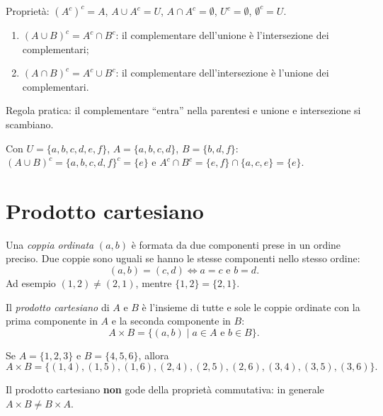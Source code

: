 \documentclass[11pt,a4paper]{article}
\begin{document}
Proprietà: $(A^c)^c = A$, \quad $A \cup A^c = U$, \quad
$A \cap A^c = \emptyset$, \quad $U^c = \emptyset$, \quad $\emptyset^c = U$.

\begin{teorema}
\begin{enumerate}
    \item $(A \cup B)^c = A^c \cap B^c$: il complementare dell'unione
          è l'intersezione dei complementari;
    \item $(A \cap B)^c = A^c \cup B^c$: il complementare
          dell'intersezione è l'unione dei complementari.
\end{enumerate}
\end{teorema}

Regola pratica: il complementare ``entra'' nella parentesi e unione e
intersezione si scambiano.

\begin{esempio}
Con $U = \{a, b, c, d, e, f\}$, $A = \{a, b, c, d\}$, $B = \{b, d, f\}$:
$(A \cup B)^c = \{a,b,c,d,f\}^c = \{e\}$ e
$A^c \cap B^c = \{e, f\} \cap \{a, c, e\} = \{e\}$.
\end{esempio}

\section{Prodotto cartesiano}

\begin{definizione}
Una \emph{coppia ordinata} $(a, b)$ è formata da due componenti prese in un
ordine preciso. Due coppie sono uguali se hanno le stesse componenti nello
stesso ordine:
\[
(a, b) = (c, d) \iff a = c \text{ e } b = d.
\]
Ad esempio $(1, 2) \neq (2, 1)$, mentre $\{1, 2\} = \{2, 1\}$.
\end{definizione}

\begin{definizione}
Il \emph{prodotto cartesiano} di $A$ e $B$ è l'insieme di tutte e sole le
coppie ordinate con la prima componente in $A$ e la seconda componente
in $B$:
\[
A \times B = \{(a, b) \mid a \in A \text{ e } b \in B\}.
\]
\end{definizione}

\begin{esempio}
Se $A = \{1, 2, 3\}$ e $B = \{4, 5, 6\}$, allora
\[
A \times B = \{(1,4), (1,5), (1,6), (2,4), (2,5), (2,6), (3,4), (3,5), (3,6)\}.
\]
\end{esempio}

Il prodotto cartesiano \textbf{non} gode della proprietà commutativa:
in generale $A \times B \neq B \times A$.
\end{document}
